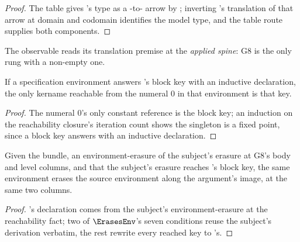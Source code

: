 \begin{proof} \leanok
{}
 The table gives 's type as a -to- arrow by
; inverting 's translation of that arrow at domain and codomain
identifies the model type, and the table route supplies both components.
\end{proof}

\begin{remark}
The observable reads its translation premise at the \emph{applied spine}: G8 is the only rung with a
non-empty one.
\end{remark}

\begin{lemma}\label{lem:Green-reachableFrom_peanoLB_zero}
 \leanok
{}
If a specification environment answers 's block key with an inductive declaration, the only
kername reachable from the \lbox{} numeral 0 in that environment is that key.
\end{lemma}

\begin{proof} \leanok
{}
 The numeral 0's only constant reference is the block key; an induction on the
reachability closure's iteration count shows the singleton is a fixed point, since a block key
answers with an inductive declaration.
\end{proof}

\begin{lemma}\label{lem:Green-g8_argErasesEnv}
 \leanok
{}
Given the  bundle, an environment-erasure of the subject's erasure at G8's body and level
columns, and that the subject's erasure reaches 's block key, the same environment erases
the source environment along the argument's \lbox{} image, at the same two columns.
\end{lemma}

\begin{proof} \leanok
{}
 's declaration comes from the subject's environment-erasure at the
reachability fact; two of $\ErasesEnv$'s seven conditions reuse the subject's derivation verbatim,
the rest rewrite every reached key to 's.
\end{proof}

